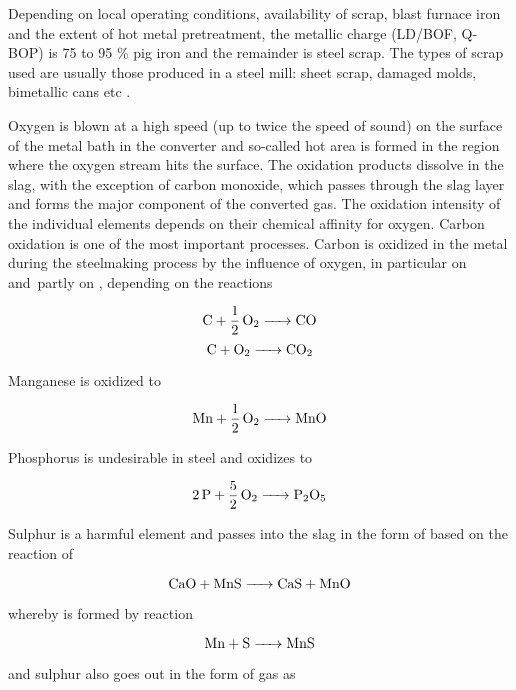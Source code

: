 Depending on local operating conditions, availability of scrap, blast furnace iron and the extent of hot metal pretreatment, the metallic charge (LD/BOF, Q-BOP) is 75 to 95 \% pig iron and the remainder is steel scrap. The types of scrap used are usually those produced in a steel mill: sheet scrap, damaged molds, bimetallic cans etc \cite{Turkdogan1996}.

Oxygen is blown at a high speed (up to twice the speed of sound) on the surface of the metal bath in the converter and so-called hot area is formed in the region where the oxygen stream hits the surface. The oxidation products dissolve in the slag, with the exception of carbon monoxide, which passes through the slag layer and forms the major component of the converted gas. The oxidation intensity of the individual elements depends on their chemical affinity for oxygen. Carbon oxidation is one of the most important processes. Carbon is oxidized in the metal during the steelmaking process by the influence of oxygen, in particular on  and~partly on , depending on the reactions

\begin{equation}
\ce{C + 1/2O2 -> CO}
\end{equation}
\begin{equation}
\ce{C + O2 -> CO2}
\end{equation}

Manganese is oxidized to 

\begin{equation}
\ce{Mn + 1/2O2 -> MnO}
\end{equation}

Phosphorus is undesirable in steel and oxidizes to 

\begin{equation}
\ce{2P + 5/2O2 -> P2O5}
\end{equation}

Sulphur is a harmful element and passes into the slag in the form of  based on the reaction of 

\begin{equation}
\ce{CaO + MnS -> CaS + MnO}
\end{equation}

whereby  is formed by reaction

\begin{equation}
\ce{Mn + S -> MnS}
\end{equation}

and sulphur also goes out in the form of gas as 

